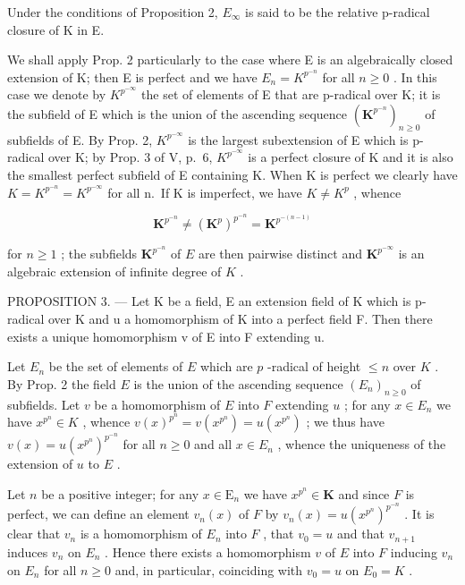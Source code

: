 Under the conditions of Proposition 2, \(E_{\infty}\) is said to be the relative p-radical closure of K in E.

We shall apply Prop. 2 particularly to the case where E is an algebraically closed extension of K; then E is perfect and we have \(E_{n} = K^{p^{-n}}\) for all \(n \geqslant 0\) . In this case we denote by \(K^{p^{-\infty}}\) the set of elements of E that are p-radical over K; it is the subfield of E which is the union of the ascending sequence \((\mathbf{K}^{p^{-n}})_{n \geqslant 0}\) of subfields of E. By Prop. 2, \(K^{p^{-\infty}}\) is the largest subextension of E which is p-radical over K; by Prop. 3 of V, p.~6, \(K^{p^{-\infty}}\) is a perfect closure of K and it is also the smallest perfect subfield of E containing K. When K is perfect we clearly have \(K = K^{p^{-n}} = K^{p^{-\infty}}\) for all n.~If K is imperfect, we have \(K \neq K^{p}\) , whence

\[
\mathbf {K} ^ {p ^ {- n}} \neq (\mathbf {K} ^ {p}) ^ {p ^ {- n}} = \mathbf {K} ^ {p ^ {- (n - 1)}}
\]

for \(n \geqslant 1\) ; the subfields \(\mathbf{K}^{p^{-n}}\) of \(E\) are then pairwise distinct and \(\mathbf{K}^{p^{-\infty}}\) is an algebraic extension of infinite degree of \(K\) .

PROPOSITION 3. --- Let K be a field, E an extension field of K which is p-radical over K and u a homomorphism of K into a perfect field F. Then there exists a unique homomorphism v of E into F extending u.

Let \(E_n\) be the set of elements of \(E\) which are \(p\) -radical of height \(\leqslant n\) over \(K\) . By Prop. 2 the field \(E\) is the union of the ascending sequence \((E_n)_{n \geqslant 0}\) of subfields. Let \(v\) be a homomorphism of \(E\) into \(F\) extending \(u\) ; for any \(x \in E_n\) we have \(x^{p^n} \in K\) , whence \(v(x)^{p^n} = v(x^{p^n}) = u(x^{p^n})\) ; we thus have \(v(x) = u(x^{p^n})^{p^{-n}}\) for all \(n \geqslant 0\) and all \(x \in E_n\) , whence the uniqueness of the extension of \(u\) to \(E\) .

Let \(n\) be a positive integer; for any \(x \in \mathrm{E}_n\) we have \(x^{p^n} \in \mathbf{K}\) and since \(F\) is perfect, we can define an element \(v_n(x)\) of \(F\) by \(v_n(x) = u(x^{p^n})^{p^{-n}}\) . It is clear that \(v_n\) is a homomorphism of \(E_n\) into \(F\) , that \(v_0 = u\) and that \(v_{n+1}\) induces \(v_n\) on \(E_n\) . Hence there exists a homomorphism \(v\) of \(E\) into \(F\) inducing \(v_n\) on \(E_n\) for all \(n \geqslant 0\) and, in particular, coinciding with \(v_0 = u\) on \(E_0 = K\) .


